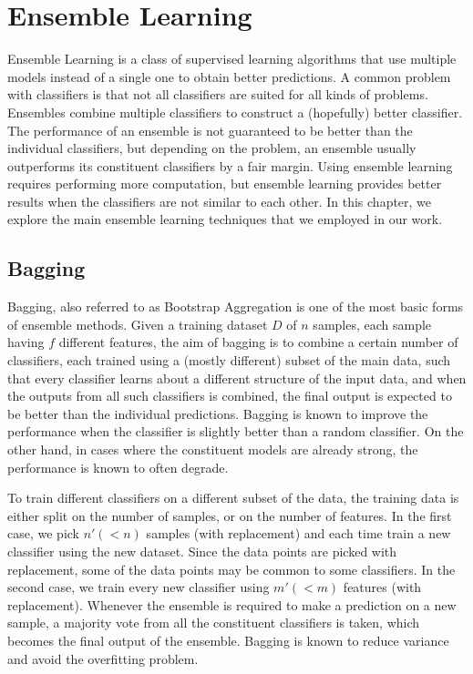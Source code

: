 \chapter{Ensemble Learning}
\label{chapter:Ensemble Learning}

Ensemble Learning is a class of supervised learning algorithms that use multiple models instead of a single one to obtain better predictions. A common problem with classifiers is that not all classifiers are suited for all kinds of problems. Ensembles combine multiple classifiers to construct a (hopefully) better classifier. The performance of an ensemble is not guaranteed to be better than the individual classifiers, but depending on the problem, an ensemble usually outperforms its constituent classifiers by a fair margin. Using ensemble learning requires performing more computation, but ensemble learning provides better results when the classifiers are not similar to each other. In this chapter, we explore the main ensemble learning techniques that we employed in our work.

\section{Bagging}
Bagging, also referred to as Bootstrap Aggregation is one of the most basic forms of ensemble methods. Given a training dataset $D$ of $n$ samples, each sample having $f$ different features, the aim of bagging is to combine a certain number of classifiers, each trained using a (mostly different) subset of the main data, such that every classifier learns about a different structure of the input data, and when the outputs from all such classifiers is combined, the final output is expected to be better than the individual predictions. Bagging is known to improve the performance when the classifier is slightly better than a random classifier. On the other hand, in cases where the constituent models are already strong, the performance is known to often degrade.

To train different classifiers on a different subset of the data, the training data is either split on the number of samples, or on the number of features. In the first case, we pick $n' (< n)$ samples (with replacement) and each time train a new classifier using the new dataset. Since the data points are picked with replacement, some of the data points may be common to some classifiers. In the second case, we train every new classifier using $m' (< m)$ features (with replacement). Whenever the ensemble is required to make a prediction on a new sample, a majority vote from all the constituent classifiers is taken, which becomes the final output of the ensemble. Bagging is known to reduce variance and avoid the overfitting problem.

